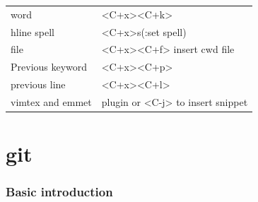 \documentclass[a4paper,11pt,twoside]{book}
\begin{document}
\begin{itemize}
\begin{tabular}{p{}|p{}}
\hline 
word & <C+x><C+k>\\ 

hline
spell & <C+x>s(:set spell)\\ 

\hline 
file & <C+x><C+f> insert cwd file  \\ 

\hline
Previous keyword & <C+x><C+p> \\

\hline
previous line & <C+x><C+l> \\

\hline 
vimtex and emmet & plugin or <C-j> to insert snippet\\

\hline
\end{tabular}

\end{itemize}

\chapter{git}

\subsection{Basic introduction}
\end{document}

